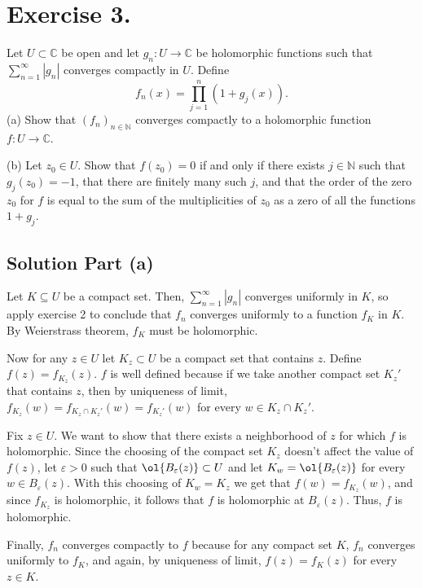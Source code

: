 
\section{Exercise 3.}

Let \(U \subset \mathbb{C}\) be open and let \(g_n : U \to \mathbb{C}\) be holomorphic functions such that \(\sum_{n=1}^{\infty} |g_n|\) converges compactly in \(U\). Define
\[
f_n(x) = \prod_{j=1}^{n} (1 + g_j(x)).
\]
(a) Show that \((f_n)_{n \in \mathbb{N}}\) converges compactly to a holomorphic function \(f : U \to \mathbb{C}\).

(b) Let \(z_0 \in U\). Show that \(f(z_0) = 0\) if and only if there exists \(j \in \mathbb{N}\) such that \(g_j(z_0) = -1\), that there are finitely many such \(j\), and that the order of the zero \(z_0\) for \(f\) is equal to the sum of the multiplicities of \(z_0\) as a zero of all the functions \(1 + g_j\).

\subsection*{Solution Part (a)}

Let $K \subseteq U$ be a compact set. Then, $\sum_{n = 1}^{\infty}|g_n|$ converges uniformly in $K$, so apply exercise 2 to conclude that $f_n$ converges uniformly to a function $f_K$ in $K$. By Weierstrass theorem, $f_K$ must be holomorphic.

Now for any $z \in U$ let $K_z \subset U$ be a compact set that contains $z$. Define $f(z) = f_{K_z}(z)$. $f$ is well defined because if we take another compact set $K_z'$ that contains $z$, then by uniqueness of limit, $f_{K_z}(w) = f_{K_z\cap K_z'}(w) = f_{K_z'}(w)$ for every $w \in K_z \cap K_z'$.

Fix $z \in U$. We want to show that there exists a neighborhood of $z$ for which $f$ is holomorphic. Since the choosing of the compact set $K_z$ doesn't affect the value of $f(z)$, let $\varepsilon > 0$ such that $\ol{B_{\varepsilon}(z)} \subset U$ and let $K_w = \ol{B_{\varepsilon }(z)}$ for every $w \in B_{\varepsilon}(z)$. With this choosing of $K_w = K_z$ we get that $f(w) = f_{K_z}(w)$, and since $f_{K_z}$ is holomorphic, it follows that $f$ is holomorphic at $B_\varepsilon(z)$. Thus, $f$ is holomorphic.

Finally, $f_n$ converges compactly to $f$ because for any compact set $K$, $f_n$ converges uniformly to $f_K$, and again, by uniqueness of limit, $f(z) = f_K(z)$ for every $z \in K$.

